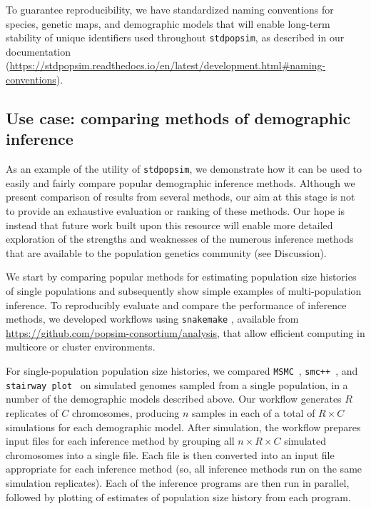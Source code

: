 \documentclass[12pt,halfline,a4paper]{ouparticle}
\newcommand{\stdpopsim}{\texttt{stdpopsim}\xspace}
\newcommand{\MSMC}{\texttt{MSMC}\xspace}
\newcommand{\smcpp}{\texttt{smc++}\xspace}
\newcommand{\stairwayplot}{\texttt{stairway plot}\xspace}
\begin{document}
To guarantee reproducibility,
we have standardized naming
conventions for species, genetic maps, and demographic models that will enable long-term stability
of unique identifiers used throughout \stdpopsim,
as described in our documentation
(\url{https://stdpopsim.readthedocs.io/en/latest/development.html#naming-conventions}).


\subsection*{Use case: comparing methods of demographic inference}

As an example of the utility of \stdpopsim, we demonstrate how it can be used
to easily and fairly compare popular demographic inference methods.
Although we present comparison of results from several
methods, our aim at this stage is not to provide an exhaustive
evaluation or ranking of these methods. Our hope is instead that future work built upon this resource
will enable more detailed exploration of the strengths and weaknesses of the numerous
inference methods that are available to the population genetics community
(see Discussion).

We start by comparing popular methods for estimating
population size histories of single populations and subsequently
show simple examples of multi-population inference.
To reproducibly evaluate and compare the performance of inference methods, we developed
workflows using \texttt{snakemake} \citep{koster2012snakemake},
available from \url{https://github.com/popsim-consortium/analysis},
that allow efficient computing in multicore or cluster environments.

For single-population population size histories, we compared
\MSMC~\citep{schiffels2014inferring}, \smcpp~\citep{terhorst2017robust}, and
\stairwayplot~\citep{liu2015exploring}
 on simulated genomes sampled from a single population,
in a number of the demographic models described above.
Our workflow generates $R$ replicates of $C$ chromosomes,
producing $n$ samples in each of a total of $R \times C$ simulations for each demographic model.
After simulation,
the workflow prepares input files for each inference method
by grouping all $n \times R \times C$ simulated chromosomes
into a single file.
Each file is then converted into an input file appropriate for each inference method
(so, all inference methods run on the same simulation replicates).
Each of the inference programs are then run in parallel, followed by plotting of
estimates of population size history from each program.
\end{document}
